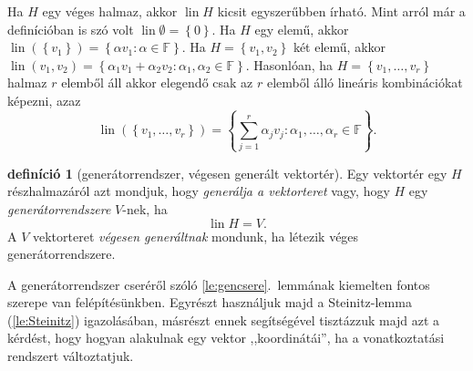 \documentclass[9pt, a4paper, showtrims]{memoir}
\theoremstyle{plain}
\theoremstyle{remark}
\theoremstyle{definition}
\newtheorem{definition}[proposition]{definíció}
\DeclareMathOperator{\lin}{lin}
\begin{document}
Ha $H$ egy véges halmaz, akkor $\lin H$ kicsit egyszerűbben írható.
Mint arról már a definícióban is szó volt $\lin \emptyset=\left\{ 0 \right\}$.
Ha $H$ egy elemű, akkor $\lin (\left\{ v_1 \right\})=\left\{ \alpha v_1:\alpha\in\mathbb{F} \right\}$.
Ha $H=\left\{ v_1,v_2 \right\}$ két elemű, akkor
$\lin({v_1,v_2})=\left\{ \alpha_1v_1+\alpha_2v_2:\alpha_1,\alpha_2\in\mathbb{F} \right\}$.
Hasonlóan, ha $H=\left\{ v_1,\ldots,v_r \right\}$ halmaz $r$ elemből áll akkor elegendő csak az $r$ elemből álló lineáris kombinációkat képezni, azaz
\[
	\lin \left( \left\{ v_1,\ldots,v_r \right\} \right)
	=
	\left\{ \sum_{j=1}^r\alpha_jv_j:\alpha_1,\ldots,\alpha_r\in\mathbb{F} \right\}.
\]
\begin{definition}[generátorrendszer, végesen generált vektortér]
	Egy vektortér egy $H$ részhalmazáról azt mondjuk, hogy \emph{generálja a vektorteret}
	vagy, hogy $H$ egy \emph{generátorrendszere} $V$-nek, ha
	\[
		\lin H=V.
	\]
	A $V$ vektorteret \emph{végesen generáltnak} mondunk, ha létezik véges generátorrendszere.
\end{definition}

A generátorrendszer cseréről szóló \ref{le:gencsere}.~lemmának kiemelten fontos szerepe van felépítésünkben.
Egyrészt használjuk majd a Steinitz-lemma (\ref{le:Steinitz}) igazolásában,
másrészt ennek segítségével tisztázzuk majd azt a kérdést,
hogy hogyan alakulnak egy vektor ,,koordinátái'', ha a vonatkoztatási rendszert változtatjuk.
\end{document}
